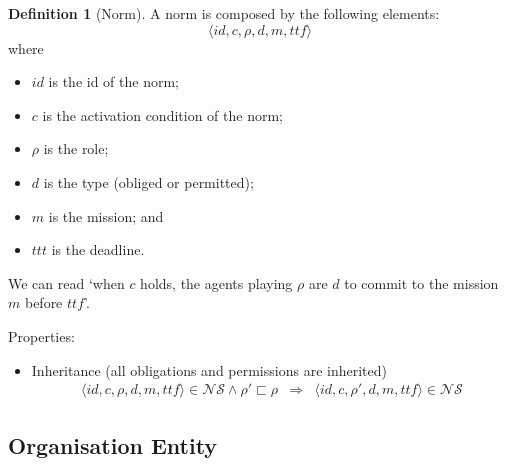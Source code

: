 \documentclass{article}
\newcommand{\set}[1]{\mathcal{#1}}
\newcommand{\subrole}{\sqsubset}
\theoremstyle{definition} \newtheorem{definition}{Definition}
\begin{document}
\begin{definition}[Norm]
  A norm is composed by the following elements:
 \begin{displaymath}
    \langle id, c, \rho, d, m, ttf \rangle
  \end{displaymath}
  where
  \begin{itemize}
  \item $id$ is the id of the norm;
  \item $c$ is the activation condition of the norm;
  \item $\rho$ is the role;
  \item $d$ is the type (obliged or permitted);
  \item $m$ is the mission; and
  \item $ttt$ is the deadline.

  \end{itemize}
  We can read `when $c$ holds, the agents playing $\rho$ are $d$ to
  commit to the mission $m$ before $ttf$'.


Properties:
\begin{itemize}
\item Inheritance (all obligations and permissions are inherited)
  \begin{eqnarray}
     \langle id, c, \rho, d, m, ttf \rangle \in \set{NS} \land \rho' \subrole \rho &\Rightarrow&  \langle id, c, \rho', d, m, ttf \rangle \in \set{NS}
  \end{eqnarray}

\end{itemize}

\end{definition}


\subsection{Organisation Entity}
\end{document}
